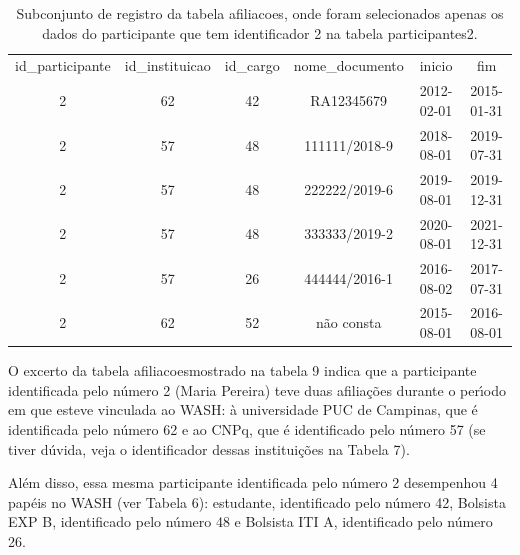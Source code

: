 \documentclass[
12pt,		%
openright,	%
twoside,  %
a4paper,			%
chapter=TITLE,		%
english,			%
french,				%
spanish,			%
brazil				%
]{USPSC-classe/USPSC}
\begin{document}
\begin{table}[htb]
\tiny
\caption{\label{e6120545268b93238330297571c4756e7c97df1a}Subconjunto de registro da tabela afiliacoes, onde foram selecionados apenas os dados do participante que tem identificador 2 na tabela participantes2.}

\centering
\begin{tabular}{|c|c|c|c|c|c|}
\hline
id\_participante  &  id\_instituicao  &  id\_cargo  &  nome\_documento  &  inicio      &  fim \\
              2  &              62  &        42  &  RA12345679      &  2012-02-01  &  2015-01-31  \\
              2  &              57  &        48  &  111111/2018-9   &  2018-08-01  &  2019-07-31  \\
              2  &              57  &        48  &  222222/2019-6   &  2019-08-01  &  2019-12-31  \\
              2  &              57  &        48  &  333333/2019-2   &  2020-08-01  &  2021-12-31  \\
              2  &              57  &        26  &  444444/2016-1   &  2016-08-02  &  2017-07-31  \\
              2  &              62  &        52  &  n\~ao consta      &  2015-08-01  &  2016-08-01 \\
\hline
\end{tabular}
\end{table}


O excerto da tabela \textquotedbl afiliacoes\textquotedbl  mostrado na tabela 9 indica que a participante identificada pelo n\'umero 2 (Maria Pereira)  teve duas afilia\c{c}\~oes durante o per\'{\i}odo em que esteve vinculada ao WASH: \`a universidade PUC de Campinas, que \'e identificada pelo n\'umero 62 e ao CNPq, que \'e identificado pelo n\'umero 57 (se tiver d\'uvida, veja o identificador dessas institui\c{c}\~oes na Tabela 7).

















Al\'em disso, essa mesma participante identificada pelo n\'umero 2 desempenhou 4 pap\'eis no WASH (ver Tabela 6): estudante, identificado pelo n\'umero 42, Bolsista EXP B, identificado pelo n\'umero 48 e Bolsista ITI A, identificado pelo n\'umero 26.
\end{document}
